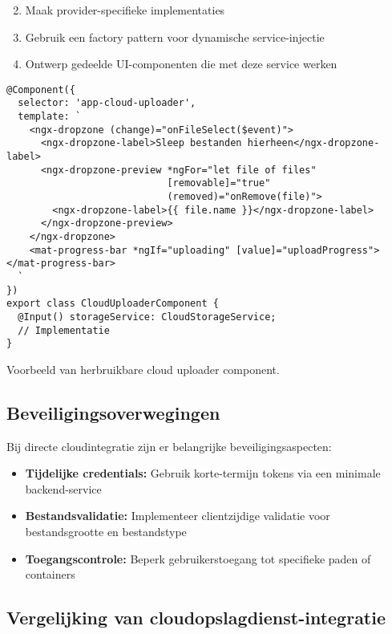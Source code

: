 \begin{enumerate}
\setcounter{enumi}{1}
    \item Maak provider-specifieke implementaties
    \item Gebruik een factory pattern voor dynamische service-injectie
    \item Ontwerp gedeelde UI-componenten die met deze service werken
\end{enumerate}

\begin{listing}[H]
\begin{verbatim}
@Component({
  selector: 'app-cloud-uploader',
  template: `
    <ngx-dropzone (change)="onFileSelect($event)">
      <ngx-dropzone-label>Sleep bestanden hierheen</ngx-dropzone-label>
      <ngx-dropzone-preview *ngFor="let file of files" 
                            [removable]="true" 
                            (removed)="onRemove(file)">
        <ngx-dropzone-label>{{ file.name }}</ngx-dropzone-label>
      </ngx-dropzone-preview>
    </ngx-dropzone>
    <mat-progress-bar *ngIf="uploading" [value]="uploadProgress"></mat-progress-bar>
  `
})
export class CloudUploaderComponent {
  @Input() storageService: CloudStorageService;
  // Implementatie
}
\end{verbatim}
\caption[Herbruikbare uploader]{Voorbeeld van herbruikbare cloud uploader component.}
\end{listing}

\subsection{Beveiligingsoverwegingen}

Bij directe cloudintegratie zijn er belangrijke beveiligingsaspecten:
\begin{itemize}
    \item \textbf{Tijdelijke credentials:} Gebruik korte-termijn tokens via een minimale backend-service
    \item \textbf{Bestandsvalidatie:} Implementeer clientzijdige validatie voor bestandsgrootte en bestandstype
    \item \textbf{Toegangscontrole:} Beperk gebruikerstoegang tot specifieke paden of containers
\end{itemize}

\subsection{Vergelijking van cloudopslagdienst-integratie}

